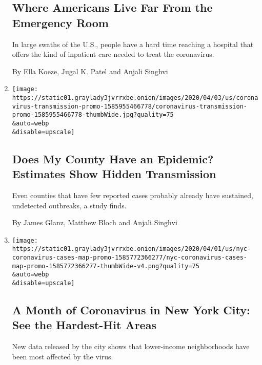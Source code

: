 \begin{enumerate}
  \hypertarget{where-americans-live-far-from-the-emergency-room}{%
  \subsection{Where Americans Live Far From the Emergency
  Room}\label{where-americans-live-far-from-the-emergency-room}}

  In large swaths of the U.S., people have a hard time reaching a
  hospital that offers the kind of inpatient care needed to treat the
  coronavirus.

  By Ella Koeze, Jugal K. Patel and Anjali Singhvi
\item
  \href{/interactive/2020/04/03/us/coronavirus-county-epidemics.html}{}

  \texttt{[image: https://static01.graylady3jvrrxbe.onion/images/2020/04/03/us/coronavirus-transmission-promo-1585955466778/coronavirus-transmission-promo-1585955466778-thumbWide.jpg?quality=75\\\&auto=webp\\\&disable=upscale]}

  \hypertarget{does-my-county-have-an-epidemic-estimates-show-hidden-transmission}{%
  \subsection{Does My County Have an Epidemic? Estimates Show Hidden
  Transmission}\label{does-my-county-have-an-epidemic-estimates-show-hidden-transmission}}

  Even counties that have few reported cases probably already have
  sustained, undetected outbreaks, a study finds.

  By James Glanz, Matthew Bloch and Anjali Singhvi
\item
  \href{/interactive/2020/04/01/nyregion/nyc-coronavirus-cases-map.html}{}

  \texttt{[image: https://static01.graylady3jvrrxbe.onion/images/2020/04/01/us/nyc-coronavirus-cases-map-promo-1585772366277/nyc-coronavirus-cases-map-promo-1585772366277-thumbWide-v4.png?quality=75\\\&auto=webp\\\&disable=upscale]}

  \hypertarget{a-month-of-coronavirus-in-new-york-city-see-the-hardest-hit-areas}{%
  \subsection{A Month of Coronavirus in New York City: See the
  Hardest-Hit
  Areas}\label{a-month-of-coronavirus-in-new-york-city-see-the-hardest-hit-areas}}

  New data released by the city shows that lower-income neighborhoods
  have been most affected by the virus.


\end{enumerate}
